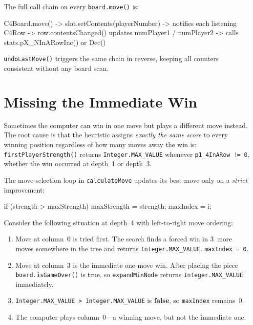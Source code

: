 \documentclass[language=english,titlepage=false,smartquotes=true]{hgbreport}
\begin{document}
The full call chain on every \texttt{board.move()} is:

\begin{JavaCode}[numbers=none]
C4Board.move()
  -> slot.setContents(playerNumber)
    -> notifies each listening C4Row
      -> row.contentsChanged() updates numPlayer1 / numPlayer2
        -> calls stats.pX_NInARowInc() or Dec()
\end{JavaCode}

\texttt{undoLastMove()} triggers the same chain in reverse, keeping all
counters consistent without any board scan.


\section{Missing the Immediate Win}

Sometimes the computer can win in one move but plays a different move instead.
The root cause is that the heuristic assigns \emph{exactly the same score} to
every winning position regardless of how many moves away the win is:
\texttt{firstPlayerStrength()} returns \texttt{Integer.MAX\_VALUE} whenever
\texttt{p1\_4InARow != 0}, whether the win occurred at depth~1 or depth~3.

The move-selection loop in \texttt{calculateMove} updates its best move only
on a \emph{strict} improvement:

\begin{JavaCode}[numbers=none]
if (strength > maxStrength) {
    maxStrength = strength;
    maxIndex = i;
}
\end{JavaCode}

Consider the following situation at depth~4 with left-to-right move ordering:

\begin{enumerate}
  \item Move at column~0 is tried first. The search finds a forced win in
        3~more moves somewhere in the tree and returns
        \texttt{Integer.MAX\_VALUE}. \texttt{maxIndex = 0}.
  \item Move at column~3 is the immediate one-move win. After placing the
        piece \texttt{board.isGameOver()} is true, so
        \texttt{expandMinNode} returns \texttt{Integer.MAX\_VALUE}
        immediately.
  \item \texttt{Integer.MAX\_VALUE > Integer.MAX\_VALUE} is \textbf{false},
        so \texttt{maxIndex} remains~0.
  \item The computer plays column~0---a winning move, but not the
        immediate one.
\end{enumerate}
\end{document}

